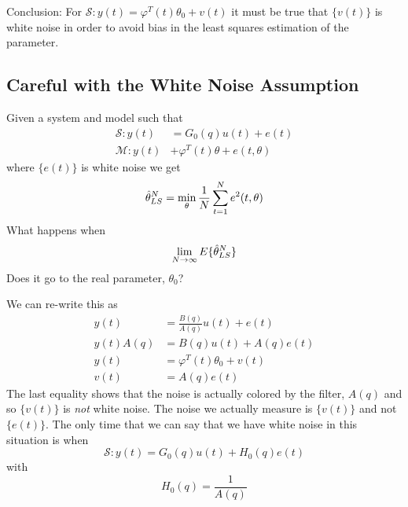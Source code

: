 Conclusion: For $\mathcal{S}: y(t) = \varphi^T(t)\theta_0 + v(t)$ it must be true that $\{v(t)\}$ is white noise in order to avoid bias in the least squares estimation of the parameter.

\subsection{Careful with the White Noise Assumption}
\label{sec:carefulwhitenoise}
Given a system and model such that
\begin{align*}
\mathcal{S}: y(t) &= G_0(q)u(t) + e(t) \\
\mathcal{M}: y(t) &+ \varphi^T(t)\theta + e(t,\theta)
\end{align*}
where $\{e(t)\}$ is white noise we get
$$\hat{\theta}_{LS}^N = \min_\theta \frac{1}{N}\sum_{t=1}^N e^2(t,\theta)$$
What happens when
$$\lim_{N\to\infty} E\{\hat{\theta}_{LS}^N\}$$
Does it go to the real parameter, $\theta_0$?

We can re-write this as
\begin{align*}
y(t) &= \frac{B(q)}{A(q)}u(t) + e(t) \\
y(t)A(q) &= B(q)u(t) + A(q)e(t) \\
y(t) &= \varphi^T(t)\theta_0 + v(t) \\
v(t) &= A(q)e(t)
\end{align*}
The last equality shows that the noise is actually colored by the filter, $A(q)$ and so $\{v(t)\}$ is \textit{not} white noise. The noise we actually measure is $\{v(t)\}$ and not $\{e(t)\}$. The only time that we can say that we have white noise in this situation is when
$$\mathcal{S}: y(t) = G_0(q)u(t) + H_0(q)e(t)$$
with
$$H_0(q) = \frac{1}{A(q)}$$


